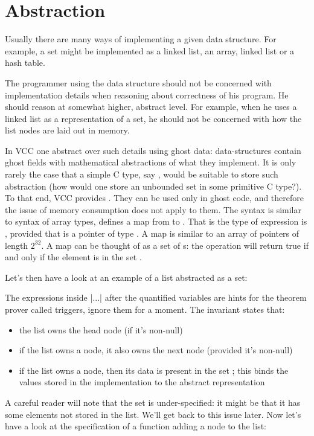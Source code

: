 \section{Abstraction}

Usually there are many ways of implementing a given data structure.
For example, a set might be implemented as a linked list, an array, linked list or a hash table.

The programmer using the data structure should not be concerned with implementation details
when reasoning about correctness of his program.
He should reason at somewhat higher, abstract level.
For example, when he uses a linked list as a representation of a set, he should not be concerned
with how the list nodes are laid out in memory.

In VCC one abstract over such details using ghost data: data-structures contain ghost fields with mathematical
abstractions of what they implement.
It is only rarely the case that a simple C type, say , would be suitable
to store such abstraction (how would one store an unbounded set in some primitive C type?).
To that end, VCC provides .
They can be used only in ghost code, and therefore the issue of memory consumption does not apply to them.
The syntax is similar to syntax of array types,  defines a map  from 
to .
That is the type of expression  is , provided that  is a pointer
of type .
A map  is similar to an array of pointers of length $2^{32}$.
A map  can be thought of as a set of s: the operation
 will return true if and only if the element  is in the set .

Let's then have a look at an example of a list abstracted as a set:


\noindent
The expressions inside \vcc|{...}| after the quantified variables are hints for
the theorem prover called triggers, ignore them for a moment.
The invariant states that:
\begin{itemize}
\item the list owns the head node (if it's non-null)
\item if the list owns a node, it also owns the next node (provided it's non-null)
\item if the list owns a node, then its data is present in the set ;
      this binds the values stored in the implementation to the abstract representation
\end{itemize}
A careful reader will note that the set  is under-specified: 
it might be that it has some elements not stored in the list.
We'll get back to this issue later.
Now let's have a look at the specification of a function adding a
node to the list:

